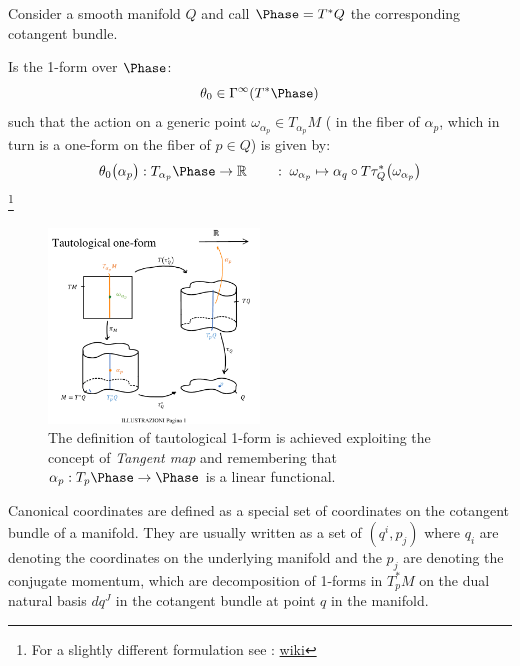 \documentclass[a4paper,12pt]{scrartcl}    %
\begin{document}
	Consider a smooth manifold $Q$ and call $\Phase=T^*Q$ the corresponding cotangent bundle.
	\begin{definition}
		Is the 1-form over $\Phase$:
		\begin{displaymath}
			\theta_0 \in \Gamma^\infty (T^*\Phase)
		\end{displaymath}
		such that the action on a generic point $ \omega_{\alpha_p} \in T_{\alpha_p}M$ ( in the fiber of $\alpha_p$, which in turn is a one-form on the fiber of $p\in Q$) is given by:
		\begin{displaymath}
			\theta_0 \big(\alpha_p \big): T_{\alpha_p}\Phase \rightarrow \Real \qquad : \; \omega_{\alpha_p} \mapsto \alpha_q \circ T \tau^*_Q \big( \omega_{\alpha_p} \big)
		\end{displaymath}
			\footnote{For a slightly different formulation see : \cite{fraenkel} \cite{fomm} \href{https://en.wikipedia.org/wiki/Tautological_one-form}{wiki}}
	\end{definition}
	\begin{figure}[h!]
   		\includegraphics[width=0.5\textwidth]{Pictures/Tautological1Form} 
 		\caption{The definition of tautological 1-form is achieved exploiting the concept of \emph{Tangent map} and remembering that $\alpha_p: T_p \Phase \rightarrow \Phase$ is a linear functional.} 
  		\centering
	\end{figure}
		\begin{notationfix}
		Canonical coordinates are defined as a special set of coordinates on the cotangent bundle of a manifold. 
		They are usually written as a set of $(q^i,p_j)$ where ${q_i}$ are denoting the coordinates on the underlying manifold and the ${p_j}$ are denoting the conjugate momentum, which are decomposition of 1-forms in $T_p^*M$ on the dual natural basis $d q^J$ in the cotangent bundle at point $q$ in the manifold.
	\end{notationfix}
	
\end{document}
